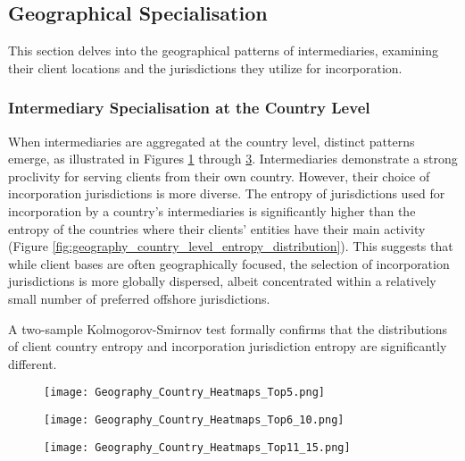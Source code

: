 \subsection{Geographical Specialisation}
This section delves into the geographical patterns of intermediaries, examining their client locations and the jurisdictions they utilize for incorporation.

\subsubsection{Intermediary Specialisation at the Country Level}
When intermediaries are aggregated at the country level, distinct patterns emerge, as illustrated in Figures \ref{fig:geography_country_heatmaps_top5} through \ref{fig:geography_country_heatmaps_top11_15}. Intermediaries demonstrate a strong proclivity for serving clients from their own country. However, their choice of incorporation jurisdictions is more diverse. The entropy of jurisdictions used for incorporation by a country's intermediaries is significantly higher than the entropy of the countries where their clients' entities have their main activity (Figure \ref{fig:geography_country_level_entropy_distribution}). This suggests that while client bases are often geographically focused, the selection of incorporation jurisdictions is more globally dispersed, albeit concentrated within a relatively small number of preferred offshore jurisdictions.

A two-sample Kolmogorov-Smirnov test formally confirms that the distributions of client country entropy and incorporation jurisdiction entropy are significantly different.

\begin{figure}[htbp]
    \centering
    \texttt{[image: Geography\_Country\_Heatmaps\_Top5.png]}
    \label{fig:geography_country_heatmaps_top5}
\end{figure}

\begin{figure}[htbp]
    \centering
    \texttt{[image: Geography\_Country\_Heatmaps\_Top6\_10.png]}
    \label{fig:geography_country_heatmaps_top6_10}
\end{figure}

\begin{figure}[htbp]
    \centering
    \texttt{[image: Geography\_Country\_Heatmaps\_Top11\_15.png]}
    \label{fig:geography_country_heatmaps_top11_15}
\end{figure}

